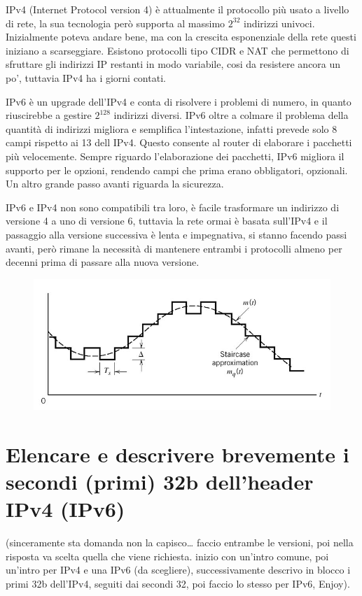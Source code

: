 IPv4 (Internet Protocol version 4) è attualmente il protocollo più usato a livello di rete, la sua tecnologia però supporta al massimo $2^32$ indirizzi univoci.
Inizialmente poteva andare bene, ma con la crescita esponenziale della rete questi iniziano a scarseggiare. Esistono protocolli tipo CIDR e NAT che permettono di sfruttare gli indirizzi IP restanti in modo variabile, cosi da resistere ancora un po’, tuttavia IPv4 ha i giorni contati.

IPv6 è un upgrade dell’IPv4 e conta di risolvere i problemi di numero, in quanto riuscirebbe a gestire $2^128$ indirizzi diversi.
IPv6 oltre a colmare il problema della quantità di indirizzi migliora e semplifica l’intestazione, infatti prevede solo 8 campi rispetto ai 13 dell IPv4. Questo consente al router di elaborare i pacchetti più velocemente. Sempre riguardo l’elaborazione dei pacchetti, IPv6 migliora il supporto per le opzioni, rendendo campi che prima erano obbligatori, opzionali. Un altro grande passo avanti riguarda la sicurezza.

IPv6 e IPv4 non sono compatibili tra loro, è facile trasformare un indirizzo di versione 4 a uno di versione 6, tuttavia la rete ormai è basata sull’IPv4 e il passaggio alla versione successiva è lenta e impegnativa, si stanno facendo passi avanti, però rimane la necessità di mantenere entrambi i protocolli almeno per decenni prima di passare alla nuova versione.

\begin{figure}[H]
\centering
\includegraphics[scale=0.6]{res/img/6_modulazioneDelta.png}
\end{figure}

\section{Elencare e descrivere brevemente i secondi (primi) 32b dell'header IPv4 (IPv6)}
(sinceramente sta domanda non la capisco… faccio entrambe le versioni, poi nella risposta va scelta quella che viene richiesta. inizio con un’intro comune, poi un’intro per IPv4 e una IPv6 (da scegliere), successivamente descrivo in blocco i primi 32b dell’IPv4, seguiti dai secondi 32, poi faccio lo stesso per IPv6, Enjoy).\\

